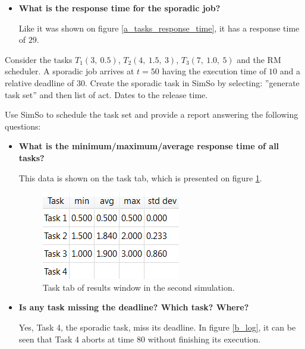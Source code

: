 \documentclass[12pt]{article}
\begin{document}
\begin{itemize}
\item \textbf{What is the response time for the sporadic job?}

Like it was shown on figure \ref{a_tasks_response_time}, it has a response time of $29$.

\end{itemize}

Consider the tasks $T_{1}(3,\ 0.5)$, $T_{2}(4,\ 1.5,\ 3)$, $T_{3}(7,\ 1.0,\ 5)$ and the RM scheduler. A sporadic job arrives at $t=50$ having the execution time of $10$ and a relative deadline of $30$. Create the sporadic task in SimSo by selecting: ”generate task set” and then list of act. Dates to the release time.

Use SimSo to schedule the task set and provide a report answering the following questions:

\begin{itemize}
\item \textbf{What is the minimum/maximum/average response time of all tasks?}

This data is shown on the task tab, which is presented on figure \ref{b_tasks_response_time}.

\begin{figure}[h]
\centering
\includegraphics[scale=1]{figures/b_tasks_response_time}   
\caption{Task tab of results window in the second simulation.}
\label{b_tasks_response_time}
\end{figure}
\FloatBarrier

\item \textbf{Is any task missing the deadline? Which task? Where?}

Yes, Task 4, the sporadic task, miss its deadline. In figure \ref{b_log}, it can be seen that Task 4 aborts at time $80$ without finishing its execution.


\end{itemize}
\end{document}

